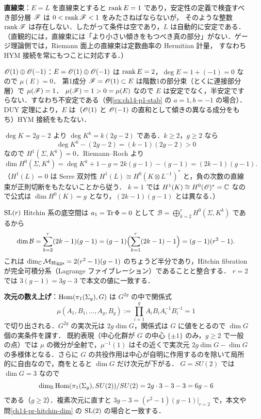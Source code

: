 \textbf{直線束}：$E=L$ を直線束とすると $\operatorname{rank} E=1$ であり，安定性の定義で検査すべき部分層 $\mathscr{F}$ は $0<\operatorname{rank}\mathscr{F}<1$ をみたさねばならないが，
そのような整数 $\operatorname{rank}\mathscr{F}$ は存在しない．したがって条件は空であり，$L$ は自動的に安定である．
（直観的には，直線束には「より小さい傾きをもつべき真の部分」がない．ゲージ理論側では，Riemann 面上の直線束は定数曲率の Hermitian 計量，
すなわち HYM 接続を常にもつことに対応する．）

\textbf{$\mathscr{O}(1)\oplus\mathscr{O}(-1)$}：$E=\mathscr{O}(1)\oplus\mathscr{O}(-1)$ は $\operatorname{rank} E=2$，$\deg E=1+(-1)=0$ なので $\mu(E)=0$．
第1成分 $\mathscr{F}=\mathscr{O}(1)\subset E$ は階数1の部分束（とくに連接部分層）で $\mu(\mathscr{F})=1$．
$\mu(\mathscr{F})=1>0=\mu(E)$ なので $E$ は安定でなく，半安定ですらない．すなわち不安定である（例\ref{ex:ch14-p1-stab} の $a=1,b=-1$ の場合）．
DUY 定理により，$E$ は（$\mathscr{O}(1)$ と $\mathscr{O}(-1)$ の直和として傾きの異なる成分をもち）HYM 接続をもたない．

$\deg K=2g-2$ より $\deg K^k=k(2g-2)$ である．$k\geq2$，$g\geq2$ なら
\begin{equation*}
  \deg K^k - (2g-2) = (k-1)(2g-2) > 0
\end{equation*}
なので $H^1(\Sigma,K^k)=0$．Riemann--Roch より
\begin{equation*}
  \dim H^0(\Sigma,K^k) = \deg K^k+1-g = 2k(g-1)-(g-1) = (2k-1)(g-1).
\end{equation*}
（$H^1(L)=0$ は Serre 双対性 $H^1(L)\cong H^0(K\otimes L^{-1})^*$ と，負の次数の直線束が正則切断をもたないことから従う．
$k=1$ では $H^1(K)\cong H^0(\mathscr{O})^*=\mathbb{C}$ なので公式は $\dim H^0(K)=g$ となり，$(2k-1)(g-1)$ とは異なる．）

$\operatorname{SL}(r)$ Hitchin 系の底空間は $a_1=\operatorname{Tr}\Phi=0$ として $\mathcal{B}=\bigoplus_{k=2}^rH^0(\Sigma,K^k)$ であるから
\begin{equation*}
  \dim\mathcal{B} = \sum_{k=2}^r(2k-1)(g-1) = (g-1)\Bigl(\sum_{k=1}^r(2k-1)-1\Bigr) = (g-1)(r^2-1).
\end{equation*}
これは $\dim_{\mathbb{C}}\mathcal{M}_{\rm Higgs}=2(r^2-1)(g-1)$ のちょうど半分であり，Hitchin fibration が完全可積分系（Lagrange ファイブレーション）であることと整合する．
$r=2$ では $3(g-1)=3g-3$ で本文の値に一致する．

\textbf{次元の数え上げ}：$\operatorname{Hom}(\pi_1(\Sigma_g),G)$ は $G^{2g}$ の中で関係式
\begin{equation*}
  \mu(A_1,B_1,\dots,A_g,B_g) := \prod_{i=1}^gA_iB_iA_i^{-1}B_i^{-1} = 1
\end{equation*}
で切り出される．$G^{2g}$ の実次元は $2g\dim G$，関係式は $G$ に値をとるので $\dim G$ 個の実条件を課す．
既約表現（中心化群が $G$ の中心 $\{\pm1\}$ のみ，$g\geq2$ で一般の点）では $\mu$ の微分が全射で，$\mu^{-1}(1)$ はその近くで実次元
$2g\dim G-\dim G$ の多様体となる．さらに $G$ の共役作用は中心が自明に作用するのを除いて局所的に自由なので，商をとると $\dim G$ だけ次元が下がる．
$G=SU(2)$ では $\dim G=3$ なので
\begin{equation*}
  \dim_{\mathbb{R}}\operatorname{Hom}(\pi_1(\Sigma_g),SU(2))/SU(2) = 2g\cdot3-3-3 = 6g-6
\end{equation*}
である（$g\geq2$）．複素次元に直すと $3g-3=(r^2-1)(g-1)|_{r=2}$ で，本文や問\ref{ch14-pr-hitchin-dim} の $\operatorname{SL}(2)$ の場合と一致する．

